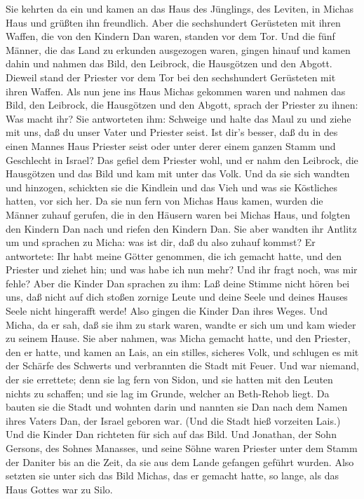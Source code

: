  Sie kehrten da ein und kamen an das Haus des Jünglings,
des Leviten, in Michas Haus und grüßten ihn freundlich. 
Aber die sechshundert Gerüsteten mit ihren Waffen, die von den Kindern
Dan waren, standen vor dem Tor.  Und die fünf Männer, die
das Land zu erkunden ausgezogen waren, gingen hinauf und kamen dahin und
nahmen das Bild, den Leibrock, die Hausgötzen und den Abgott. Dieweil
stand der Priester vor dem Tor bei den sechshundert Gerüsteten mit ihren
Waffen.  Als nun jene ins Haus Michas gekommen waren und
nahmen das Bild, den Leibrock, die Hausgötzen und den Abgott, sprach der
Priester zu ihnen: Was macht ihr?  Sie antworteten ihm:
Schweige und halte das Maul zu und ziehe mit uns, daß du unser Vater und
Priester seist. Ist dir's besser, daß du in des einen Mannes Haus
Priester seist oder unter derer einem ganzen Stamm und Geschlecht in
Israel?  Das gefiel dem Priester wohl, und er nahm den
Leibrock, die Hausgötzen und das Bild und kam mit unter das Volk.
 Und da sie sich wandten und hinzogen, schickten sie die
Kindlein und das Vieh und was sie Köstliches hatten, vor sich her.
 Da sie nun fern von Michas Haus kamen, wurden die Männer
zuhauf gerufen, die in den Häusern waren bei Michas Haus, und folgten
den Kindern Dan nach und riefen den Kindern Dan.  Sie aber
wandten ihr Antlitz um und sprachen zu Micha: was ist dir, daß du also
zuhauf kommst?  Er antwortete: Ihr habt meine Götter
genommen, die ich gemacht hatte, und den Priester und ziehet hin; und
was habe ich nun mehr? Und ihr fragt noch, was mir fehle? 
Aber die Kinder Dan sprachen zu ihm: Laß deine Stimme nicht hören bei
uns, daß nicht auf dich stoßen zornige Leute und deine Seele und deines
Hauses Seele nicht hingerafft werde!  Also gingen die
Kinder Dan ihres Weges. Und Micha, da er sah, daß sie ihm zu stark
waren, wandte er sich um und kam wieder zu seinem Hause. 
Sie aber nahmen, was Micha gemacht hatte, und den Priester, den er
hatte, und kamen an Lais, an ein stilles, sicheres Volk, und schlugen es
mit der Schärfe des Schwerts und verbrannten die Stadt mit Feuer.
 Und war niemand, der sie errettete; denn sie lag fern von
Sidon, und sie hatten mit den Leuten nichts zu schaffen; und sie lag im
Grunde, welcher an Beth-Rehob liegt. Da bauten sie die Stadt und wohnten
darin  und nannten sie Dan nach dem Namen ihres Vaters Dan,
der Israel geboren war. (Und die Stadt hieß vorzeiten Lais.)
 Und die Kinder Dan richteten für sich auf das Bild. Und
Jonathan, der Sohn Gersons, des Sohnes Manasses, und seine Söhne waren
Priester unter dem Stamm der Daniter bis an die Zeit, da sie aus dem
Lande gefangen geführt wurden.  Also setzten sie unter sich
das Bild Michas, das er gemacht hatte, so lange, als das Haus Gottes war
zu Silo.

